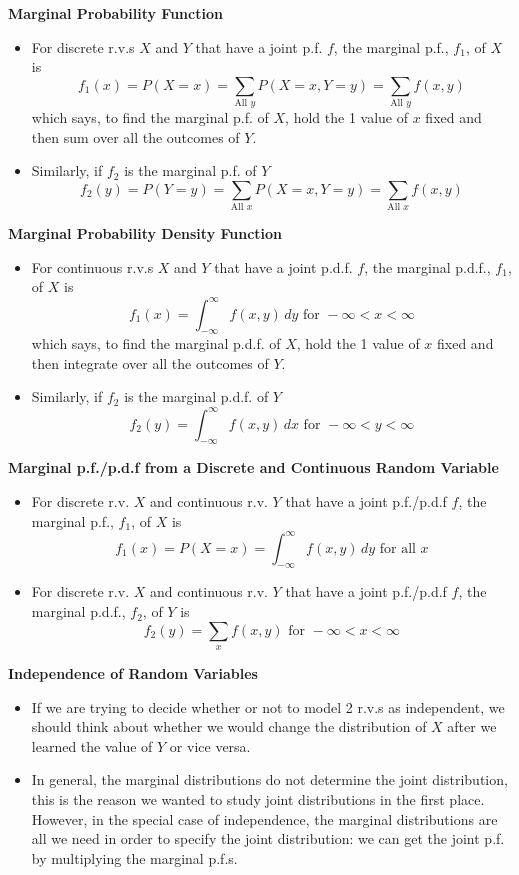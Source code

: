 \documentclass[11pt]{article}
\begin{document}
\textbf{Marginal Probability Function}
\begin{itemize}
    \item For discrete r.v.s $X$ and $Y$ that have a joint p.f. $f$, the marginal p.f., $f_1$,
    of $X$ is 
    \[ f_1(x) = P(X=x)= \sum_{\text{All } y} P(X=x, Y=y) = \sum_{\text{All } y} f(x,y) \]
    which says, to find the marginal p.f. of $X$, hold the 1 value of $x$ fixed and then sum 
    over all the outcomes of $Y$.
    \item Similarly, if $f_2$ is the marginal p.f. of $Y$
    \[ f_2(y) = P(Y=y)= \sum_{\text{All } x} P(X=x, Y=y) = \sum_{\text{All } x} f(x,y) \]

\end{itemize}

\textbf{Marginal Probability Density Function}
\begin{itemize}
    \item For continuous r.v.s $X$ and $Y$ that have a joint p.d.f. $f$, the marginal p.d.f., 
    $f_1$, of $X$ is 
    \[ f_1(x) = \int_{-\infty}^{\infty} f(x,y) \,dy \text{\ \ \ for } -\infty < x < \infty \]
    which says, to find the marginal p.d.f. of $X$, hold the 1 value of $x$ fixed and then 
    integrate over all the outcomes of $Y$.
    \item Similarly, if $f_2$ is the marginal p.d.f. of $Y$
    \[ f_2(y) = \int_{-\infty}^{\infty} f(x,y) \,dx \text{\ \ \ for } -\infty < y < \infty \]
\end{itemize}

\textbf{Marginal p.f./p.d.f from a Discrete and Continuous Random Variable}
\begin{itemize}
    \item For discrete r.v. $X$ and continuous r.v. $Y$ that have a joint p.f./p.d.f $f$, the 
    marginal p.f., $f_1$, of $X$ is 
    \[ f_1(x) = P(X=x) = \int_{-\infty}^{\infty} f(x,y) \,dy \text{\ \ \ for all } x \]
    \item For discrete r.v. $X$ and continuous r.v. $Y$ that have a joint p.f./p.d.f $f$, the 
    marginal p.d.f., $f_2$, of $Y$ is 
    \[ f_2(y) = \sum_{x} f(x,y) \text{\ \ \ for } -\infty < x < \infty \]
\end{itemize}

\textbf{Independence of Random Variables}
\begin{itemize}
    \item If we are trying to decide whether or not to model 2 r.v.s as independent, we should
    think about whether we would change the distribution of $X$ after we learned the value of 
    $Y$ or vice versa.
    \item In general, the marginal distributions do not determine the joint distribution, this 
    is the reason we wanted to study joint distributions in the first place. However, in the 
    special case of independence, the marginal distributions are all we need in order to 
    specify the joint distribution: we can get the joint p.f. by multiplying the marginal 
    p.f.s.
\end{itemize}
\end{document}
